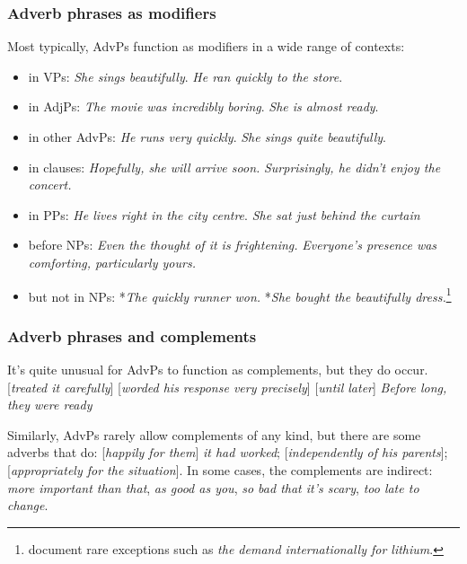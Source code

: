 \subsubsection*{Adverb phrases as modifiers}

Most typically, AdvPs function as modifiers in a wide range of contexts:

\begin{itemize}[noitemsep]
   \item in VPs: \textit{She sings \emph{beautifully}}. \textit{He ran \emph{quickly} to the store}.
   \item in AdjPs: \textit{The movie was \emph{incredibly} boring}. \textit{She is \emph{almost} ready}.
   \item in other AdvPs: \textit{He runs \emph{very} quickly}.  \textit{She sings \emph{quite} beautifully}.
   \item in clauses: \textit{\emph{Hopefully}, she will arrive soon.} \textit{\emph{Surprisingly}, he didn't enjoy the concert.}
   \item in PPs: \textit{He lives \emph{right} in the city centre}. \textit{She sat \emph{just} behind the curtain}
   \item before NPs: \textit{\emph{Even} the thought of it is frightening.} \textit{Everyone's presence was comforting, \emph{particularly} yours.}
   \item but not in NPs: *\textit{The \emph{quickly} runner won.} *\textit{She bought the \emph{beautifully} dress.}\footnote{\citet{payne2010} document rare exceptions such as \textit{the demand \emph{internationally} for lithium}.}
\end{itemize}

\subsubsection*{Adverb phrases and complements}
\label{sec:AdvPs+Comps}
It's quite unusual for AdvPs to function as complements, but they do occur. [\textit{treated it \emph{carefully}}] [\textit{worded his response \emph{very precisely}}] [\textit{until \emph{later}}] \textit{{\ob}Before \emph{long}{\cb}, they were ready}

Similarly, AdvPs rarely allow complements of any kind, but there are some adverbs that do: [\textit{\emph{happily} for them}]\textit{ it had worked}; [\textit{\emph{independently} of his parents}]; [\textit{\emph{appropriately} for the situation}]. In some cases, the complements are indirect: \textit{\emph{more} important \emph{than that}}, \textit{\emph{as} good \emph{as you}}, \textit{\emph{so} bad \emph{that it's scary}}, \textit{\emph{too} late \emph{to change}}.


